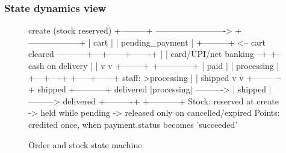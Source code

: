 \documentclass[11pt,a4paper]{article}
\begin{document}
\subsubsection{State dynamics view}

\begin{figure}[H]
\centering
\begin{asciiart}
                    create (stock reserved)
        +---------+ -------------------------> +------------------+
        |  cart   |                              | pending_payment  |
        +---------+ <-- cart cleared -----------+---+------+-------+
                                                     |      |
                              card/UPI/net banking --+      +-- cash on delivery
                                        |                          |
                                        v                          v
                                   +--------+                +------------+
                                   |  paid  |                | processing |
                                   +---+----+                +-----+------+
                        staff: >processing |                       | shipped
                                           v                       v
                                     +----------+  shipped    +-----------+  delivered
                                     |processing| ----------> |  shipped  | ---------> delivered
                                     +----------+             +-----------+
   Stock:  reserved at create -> held while pending -> released only on cancelled/expired
   Points: credited once, when payment.status becomes 'succeeded'
\end{asciiart}
\caption{Order and stock state machine}\label{fig:state}
\end{figure}
\end{document}
